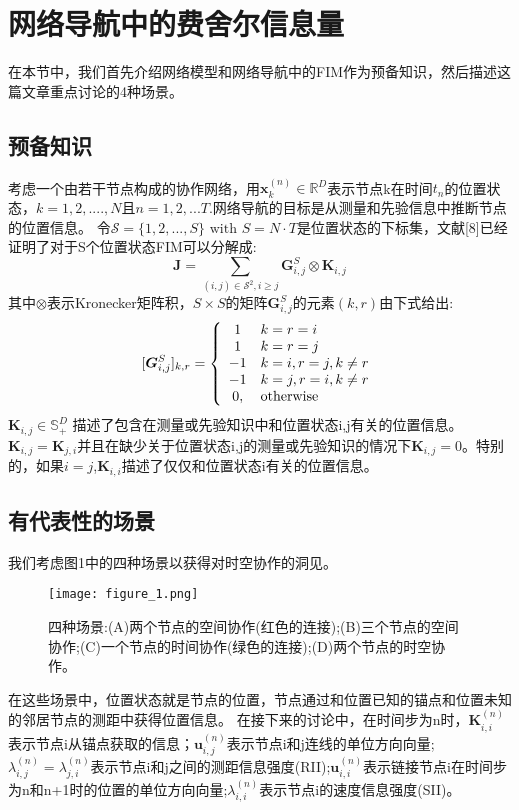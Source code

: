 \section{网络导航中的费舍尔信息量}
在本节中，我们首先介绍网络模型和网络导航中的FIM作为预备知识，然后描述这篇文章重点讨论的4种场景。
\subsection{预备知识}
考虑一个由若干节点构成的协作网络，用$\bm{x}_k^{(n)}\in \mathbb{R}^D$表示节点k在时间$t_n$的位置状态，$k=1,2,....,N$且$n=1,2,...T$.网络导航的目标是从测量和先验信息中推断节点的位置信息。
令$\mathcal{S}=\{1,2,...,S\}\text{ with }S=N\cdot T$是位置状态的下标集，文献[8]已经证明了对于S个位置状态FIM可以分解成:
\begin{equation}
\bm{J}=\sum_{(i,j)\in \mathcal{S}^2,i\geq j} \bm{G}^S_{i,j} \otimes \bm{K}_{i,j}
\end{equation}
其中$\otimes$表示Kronecker矩阵积，$S\times S$的矩阵$\bm{G}^S_{i,j}$的元素$(k,r)$由下式给出:
\[
[\bm{G}^S_{i,j}]_{k,r}=\left\{
\begin{array}{c l}	
     1 & k=r=i\\
     1 & k=r=j\\
     -1 & k=i,r=j,k \neq r\\
     -1 & k=j,r=i,k \neq r\\
     0, & \text{otherwise}
\end{array}\right.
\]
$\bm{K}_{i,j}\in \mathbb{S}_+^D$ 描述了包含在测量或先验知识中和位置状态i,j有关的位置信息。$\bm{K}_{i,j}=\bm{K}_{j,i}$并且在缺少关于位置状态i,j的测量或先验知识的情况下$\bm{K}_{i,j}=0$。特别的，如果$i=j$,$\bm{K}_{i,i}$描述了仅仅和位置状态i有关的位置信息。
\subsection{有代表性的场景}
我们考虑图1中的四种场景以获得对时空协作的洞见。
\begin{figure}
\centering
\texttt{[image: figure\_1.png]}
\caption{四种场景:(A)两个节点的空间协作(红色的连接);(B)三个节点的空间协作;(C)一个节点的时间协作(绿色的连接);(D)两个节点的时空协作。}
\end{figure}

在这些场景中，位置状态就是节点的位置，节点通过和位置已知的锚点和位置未知的邻居节点的测距中获得位置信息。
在接下来的讨论中，在时间步为n时，$\bm{K}^{(n)}_{i,i}$表示节点i从锚点获取的信息；$\bm{u}_{i,j}^{(n)}$表示节点i和j连线的单位方向向量;$\lambda^{(n)}_{i,j}=\lambda^{(n)}_{j,i}$表示节点i和j之间的测距信息强度(RII);$\bm{u}_{i,i}^{(n)}$表示链接节点i在时间步为n和n+1时的位置的单位方向向量;$\lambda^{(n)}_{i,i}$表示节点i的速度信息强度(SII)。

